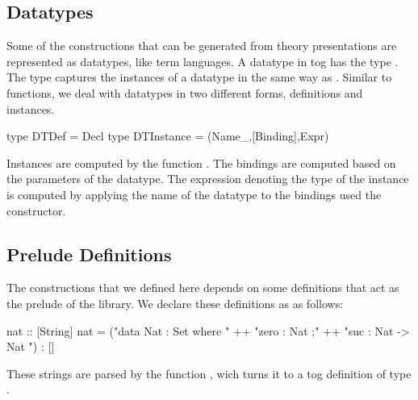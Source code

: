 \subsection{Datatypes}
\label{subsec:generation:datatypes}
Some of the constructions that can be generated from theory presentations are represented as datatypes, like term languages. A datatype in tog has the type . The type  captures the instances of a datatype in the same way as .
Similar to functions, we deal with datatypes in two different forms, definitions and instances. 
\begin{hscode}
type DTDef = Decl
type DTInstance = (Name_,[Binding],Expr) 
\end{hscode}
Instances are computed by the function . The bindings are computed based on the parameters of the datatype. The expression denoting the type of the instance is computed by applying the name of the datatype to the bindings used the  constructor. 

\begin{comment}
\subsection{Renaming}
\label{subsec:generation:renaming}
In multiple positions what we do is substitution, i.e. traverse the datatype and replace the occurence of one variable with another. 

\subsection{Bindings}
\label{subsec:generation:bindings}
Bindings are pervasive in definitions and are so important to deal with. We provide several utility functions for indexing bindings, repeating them, and other basic operations. 
The most interesting of all is the case when the bindings of two different entities need to be combined together, like in the case when both entities are arguments to a function.\ednote{Q: Is there literature on this?}  
\ednote{Q: How useful is the bindings section? Should I keep it?}
\end{comment}

\subsection{Prelude Definitions}
\label{subsec:generation:prelude}
The constructions that we defined here depends on some definitions that act as the prelude of the library. We declare these definitions as \lstmath{[String]} as follows: 
\begin{hscode}
nat :: [String]
nat =
  ("data Nat : Set where { " ++ 
     "zero : Nat ;" ++ 
     "suc  : Nat -> Nat }") : []
\end{hscode}
These strings are parsed by the function , wich turns it to a tog definition of type . 

